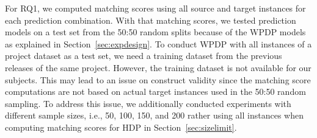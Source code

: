 For RQ1, we computed matching scores using all
	source and target instances for each prediction combination.
	With that matching scores, we tested prediction models on a test set from the 50:50 random splits because of the WPDP models as explained in Section~\ref{sec:expdesign}.
	To conduct WPDP with all instances of a project dataset as a test set, we need a training dataset from the previous releases of the same project. However, the training dataset is not
	available for our subjects. This may lead to an issue on construct validity since the matching score computations are not based on actual target instances used in the 50:50 random sampling. To address this issue, we additionally conducted experiments with different sample sizes, i.e., 50, 100, 150, and 200 rather using all instances when computing matching scores for HDP in Section~\ref{sec:sizelimit}.
	

